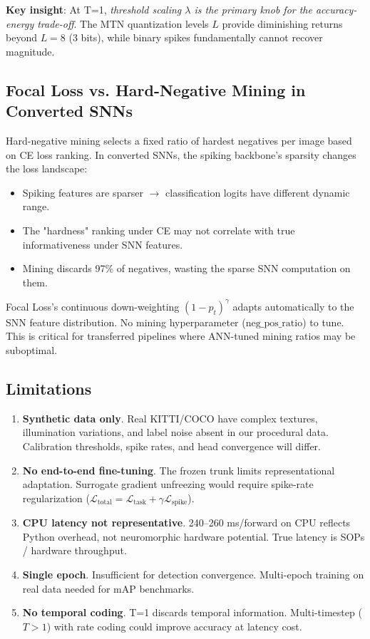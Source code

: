 \documentclass[10pt,conference]{IEEEtran}
\begin{document}
\textbf{Key insight}: At T=1, \textit{threshold scaling $\lambda$ is the primary knob for the accuracy-energy trade-off}. The MTN quantization levels $L$ provide diminishing returns beyond $L=8$ (3 bits), while binary spikes fundamentally cannot recover magnitude.

\subsection{Focal Loss vs. Hard-Negative Mining in Converted SNNs}

Hard-negative mining selects a fixed ratio of hardest negatives per image based on CE loss ranking. In converted SNNs, the spiking backbone's sparsity changes the loss landscape:

\begin{itemize}
    \item Spiking features are sparser $\rightarrow$ classification logits have different dynamic range.
    \item The "hardness" ranking under CE may not correlate with true informativeness under SNN features.
    \item Mining discards 97\% of negatives, wasting the sparse SNN computation on them.
\end{itemize}

Focal Loss's continuous down-weighting $(1-p_t)^\gamma$ adapts automatically to the SNN feature distribution. No mining hyperparameter ($\text{neg\_pos\_ratio}$) to tune. This is critical for transferred pipelines where ANN-tuned mining ratios may be suboptimal.

\subsection{Limitations}

\begin{enumerate}
    \item \textbf{Synthetic data only}. Real KITTI/COCO have complex textures, illumination variations, and label noise absent in our procedural data. Calibration thresholds, spike rates, and head convergence will differ.
    \item \textbf{No end-to-end fine-tuning}. The frozen trunk limits representational adaptation. Surrogate gradient unfreezing would require spike-rate regularization ($\mathcal{L}_{\text{total}} = \mathcal{L}_{\text{task}} + \gamma \mathcal{L}_{\text{spike}}$).
    \item \textbf{CPU latency not representative}. 240--260 ms/forward on CPU reflects Python overhead, not neuromorphic hardware potential. True latency is SOPs / hardware throughput.
    \item \textbf{Single epoch}. Insufficient for detection convergence. Multi-epoch training on real data needed for mAP benchmarks.
    \item \textbf{No temporal coding}. T=1 discards temporal information. Multi-timestep ($T>1$) with rate coding could improve accuracy at latency cost.
\end{enumerate}
\end{document}
